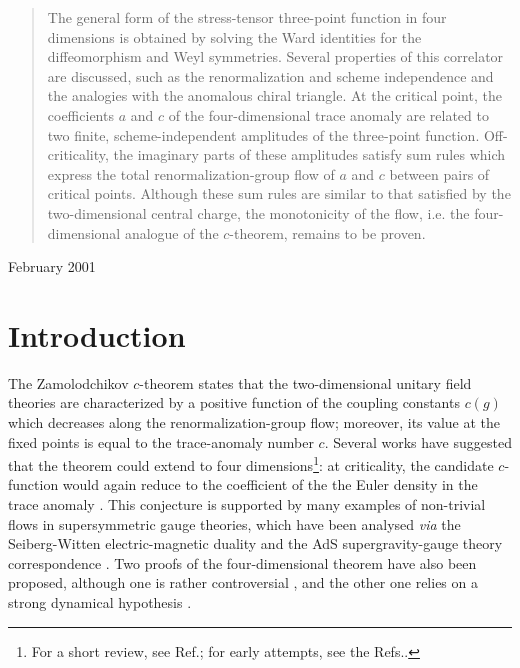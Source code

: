 \documentclass[11pt]{article}
\begin{document}
\begin{titlepage}
\begin{center}
\begin{abstract} 
The general form of the stress-tensor three-point function in four  
dimensions is obtained by solving the Ward identities 
for the diffeomorphism and Weyl symmetries.
Several properties of this correlator are discussed, such as
the renormalization and scheme independence and the analogies
with the anomalous chiral triangle.
At the critical point, the coefficients $a$ and $c$ of the four-dimensional 
trace anomaly are related to two finite, scheme-independent
amplitudes of the three-point function.
Off-criticality, the imaginary parts of these amplitudes satisfy sum rules
which express the total renormalization-group flow 
of $a$ and $c$ between pairs of critical points.
Although these sum rules are similar to that satisfied by the two-dimensional 
central charge, the monotonicity of the flow, i.e.
the four-dimensional analogue of the $c$-theorem, remains to be proven. 
\end{abstract} 
 
\vfill 
\hfill February 2001
\end{center} 
 
\end{titlepage} 
 
 
 
 
\section{Introduction} 


The Zamolodchikov $c$-theorem \cite{cth} states that the
two-dimensional unitary field theories are characterized by a 
positive function of the coupling constants $c(g)$ which
decreases along the renormalization-group flow;
moreover, its value at the fixed points is equal 
to the trace-anomaly number $c$.
Several works have suggested that the theorem could extend to 
four dimensions\footnote{
For a short review, see Ref.\cite{cdgm}; for early attempts, see the
Refs.\cite{cardy}\cite{jo}\cite{cfl}.}:
at criticality, the candidate $c$-function would again reduce 
to the coefficient of the the Euler density in the trace anomaly \cite{cardy}.
This conjecture is supported by many examples 
of non-trivial flows in supersymmetric gauge theories,
which have been analysed {\it via} the Seiberg-Witten  
electric-magnetic duality \cite{afgj} 
and the AdS supergravity-gauge theory correspondence \cite{fgpw}\cite{c-a}. 
Two proofs of the four-dimensional theorem
have also been proposed, although one is rather controversial
\cite{fl}, and the other one relies on a strong dynamical hypothesis
\cite{ath}.
\end{document}
